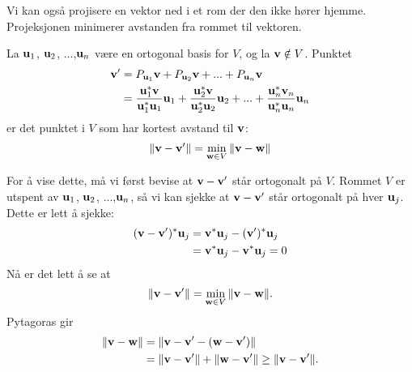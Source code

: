 \noindent Vi kan også projisere en vektor ned i et rom der den ikke hører hjemme. Projeksjonen minimerer avstanden fra rommet til vektoren.
\begin{thm}
La $\mathbf{u}_1$, $\mathbf{u} _2$, ...,$\mathbf{u}_n$ være en ortogonal basis for $V$, og la $\mathbf{v} \notin V$. Punktet
\begin{align*}
\mathbf{v}'&= P_{\mathbf{u}_1} \mathbf{v} + P_{\mathbf{u}_2} \mathbf{v} + ... +P_{\mathbf{u}_n} \mathbf{v}\\ &= \frac{\mathbf{u}_1^*\mathbf{v}}{\mathbf{u}_1^*\mathbf{u}_1}\mathbf{u}_1 + \frac{\mathbf{u}_2^*\mathbf{v}}{\mathbf{u}_2^*\mathbf{u}_2}\mathbf{u}_2+...+\frac{\mathbf{u}_n^*\mathbf{v}_n}{\mathbf{u}_n^*\mathbf{u}_n}\mathbf{u}_n
\end{align*}
er det punktet i $V$ som har kortest avstand til $\mathbf{v}$:
\[
\|\mathbf{v}-\mathbf{v}' \|=\min_{\mathbf{w} \in V} \|\mathbf{v}-\mathbf{w} \|
\]
\end{thm}
\noindent For å vise dette, må vi først bevise at $\mathbf{v}-\mathbf{v}'$ står ortogonalt på $V$. Rommet $V$ er utspent av $\mathbf{u}_1$, $\mathbf{u} _2$, ...,$\mathbf{u}_n$, så vi kan sjekke at $\mathbf{v}-\mathbf{v}'$ står ortogonalt på hver $\mathbf{u}_j$. Dette er lett å sjekke:
\begin{align*}
(\mathbf{v}-\mathbf{v}')^*\mathbf{u}_j&=\mathbf{v}^*\mathbf{u}_j-(\mathbf{v}')^*\mathbf{u}_j \\ &=\mathbf{v}^*\mathbf{u}_j-\mathbf{v}^*\mathbf{u}_j =0
\end{align*}
Nå er det lett å se at
\[
\|\mathbf{v}-\mathbf{v}' \|=\min_{\mathbf{w} \in V} \|\mathbf{v}-\mathbf{w} \|.
\]
Pytagoras gir
\begin{align*}
\|\mathbf{v}-\mathbf{w} \|&=\|\mathbf{v}-\mathbf{v}'-(\mathbf{w}-\mathbf{v}') \|\\&= \|\mathbf{v}-\mathbf{v}' \| +\|\mathbf{w}-\mathbf{v}' \|  \geq  \|\mathbf{v}-\mathbf{v}' \|.
\end{align*}


